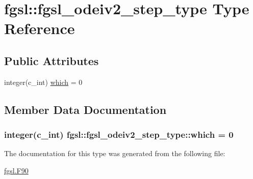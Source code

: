\hypertarget{structfgsl_1_1fgsl__odeiv2__step__type}{}\section{fgsl\+:\+:fgsl\+\_\+odeiv2\+\_\+step\+\_\+type Type Reference}
\label{structfgsl_1_1fgsl__odeiv2__step__type}
\subsection*{Public Attributes}
\begin{DoxyCompactItemize}
\item 
integer(c\+\_\+int) \hyperlink{structfgsl_1_1fgsl__odeiv2__step__type_ab4a77212d5bcaad18c0983e035d3e29f}{which} = 0
\end{DoxyCompactItemize}


\subsection{Member Data Documentation}
\hypertarget{structfgsl_1_1fgsl__odeiv2__step__type_ab4a77212d5bcaad18c0983e035d3e29f}{}
\subsubsection[{which}]{\setlength{\rightskip}{0pt plus 5cm}integer(c\+\_\+int) fgsl\+::fgsl\+\_\+odeiv2\+\_\+step\+\_\+type\+::which = 0}\label{structfgsl_1_1fgsl__odeiv2__step__type_ab4a77212d5bcaad18c0983e035d3e29f}


The documentation for this type was generated from the following file\+:\begin{DoxyCompactItemize}
\item 
\hyperlink{fgsl_8F90}{fgsl.\+F90}\end{DoxyCompactItemize}
